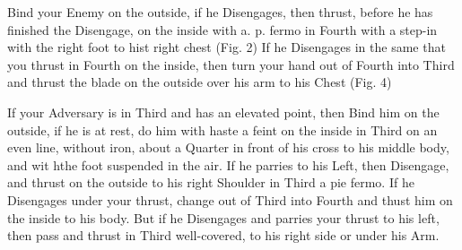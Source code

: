 \newpage


\newpage


Bind your Enemy on the outside, if he Disengages, then thrust, before
he has finished the Disengage, on the inside with a. p. fermo in
Fourth with a step-in with the right foot to hist right chest (Fig. 2)
If he Disengages in the same that you thrust in Fourth on the inside,
then turn your hand out of Fourth into Third and thrust the blade on
the outside over his arm to his Chest (Fig. 4)

If your Adversary is in Third and has an elevated point, then Bind him
on the outside, if he is at rest, do him with haste a feint on the
inside in Third on an even line, without iron, about a Quarter in
front of his cross to his middle body, and wit hthe foot suspended in the air. If he
parries to his Left, then Disengage, and thrust on the outside to his
right Shoulder in Third a pie fermo. If he Disengages under your
thrust, change out of Third into Fourth and thust him on the inside to
his body. But if he Disengages and parries your thrust to his left,
then pass and thrust in Third well-covered, to his right side or under
his Arm.

